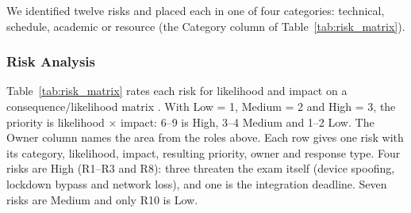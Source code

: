 We identified twelve risks and placed each in one of four categories: technical, schedule, academic or resource (the Category column of Table~\ref{tab:risk_matrix}).

\subsubsection{Risk Analysis}

Table~\ref{tab:risk_matrix} rates each risk for likelihood and impact on a consequence/likelihood matrix \cite{iec31010}. With Low = 1, Medium = 2 and High = 3, the priority is likelihood $\times$ impact: 6--9 is High, 3--4 Medium and 1--2 Low. The Owner column names the area from the roles above. Each row gives one risk with its category, likelihood, impact, resulting priority, owner and response type. Four risks are High (R1--R3 and R8): three threaten the exam itself (device spoofing, lockdown bypass and network loss), and one is the integration deadline. Seven risks are Medium and only R10 is Low.

